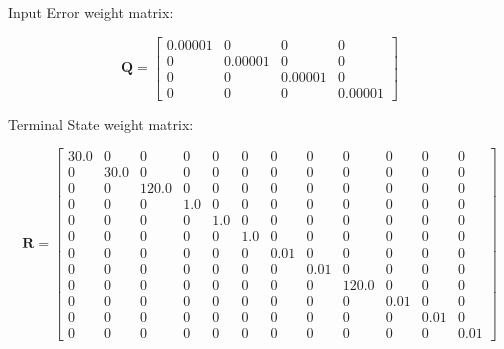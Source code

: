 Input Error weight matrix:

\begin{equation*}
\mathbf{Q} = \begin{bmatrix} 0.00001 & 0 & 0 & 0 \\
0 & 0.00001 & 0 & 0 \\
0 & 0 & 0.00001 & 0 \\
0 & 0 & 0 & 0.00001 \end{bmatrix}
\end{equation*}

Terminal State weight matrix:

\begin{equation*}
\mathbf{R} = \begin{bmatrix} 30.0 & 0 & 0 & 0 & 0 & 0 & 0 & 0 & 0 & 0 & 0 & 0 \\
0 & 30.0 & 0 & 0 & 0 & 0 & 0 & 0 & 0 & 0 & 0 & 0 \\
0 & 0 & 120.0 & 0 & 0 & 0 & 0 & 0 & 0 & 0 & 0 & 0 \\
0 & 0 & 0 & 1.0 & 0 & 0 & 0 & 0 & 0 & 0 & 0 & 0 \\
0 & 0 & 0 & 0 & 1.0 & 0 & 0 & 0 & 0 & 0 & 0 & 0 \\
0 & 0 & 0 & 0 & 0 & 1.0 & 0 & 0 & 0 & 0 & 0 & 0 \\
0 & 0 & 0 & 0 & 0 & 0 & 0.01 & 0 & 0 & 0 & 0 & 0 \\
0 & 0 & 0 & 0 & 0 & 0 & 0 & 0.01 & 0 & 0 & 0 & 0 \\
0 & 0 & 0 & 0 & 0 & 0 & 0 & 0 & 120.0 & 0 & 0 & 0 \\
0 & 0 & 0 & 0 & 0 & 0 & 0 & 0 & 0 & 0.01 & 0 & 0 \\
0 & 0 & 0 & 0 & 0 & 0 & 0 & 0 & 0 & 0 & 0.01 & 0 \\
0 & 0 & 0 & 0 & 0 & 0 & 0 & 0 & 0 & 0 & 0 & 0.01 \end{bmatrix}
\end{equation*}





